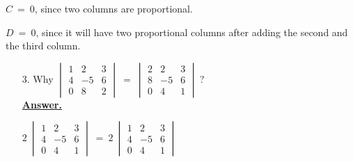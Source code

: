 \documentclass{article}
\begin{document}

$C\ =\ 0$, since two columns are proportional.

$D\ =\ 0$, since it will have two proportional columns after adding the second and the third column.

\begin{enumerate}
    \item [3.] Why 
    $\begin{vmatrix}
    1 & 2 & 3\\
    4 & -5 & 6\\
    0 & 8 & 2
    \end{vmatrix}
    \ =\ 
    \begin{vmatrix}
    2 & 2 & 3\\
    8 & -5 & 6\\
    0 & 4 & 1
    \end{vmatrix}
    \ $?\\
    
    
    \underline{\textbf{Answer.}}
    \begin{center}
    $
    2\ \begin{vmatrix}
    1 & 2 & 3\\
    4 & -5 & 6\\
    0 & 4 & 1
    \end{vmatrix}
    \ =\ 
    2\ 
    \begin{vmatrix}
    1 & 2 & 3\\
    4 & -5 & 6\\
    0 & 4 & 1
    \end{vmatrix}
    $\\
    \end{center}
    

\end{enumerate}
\end{document}
